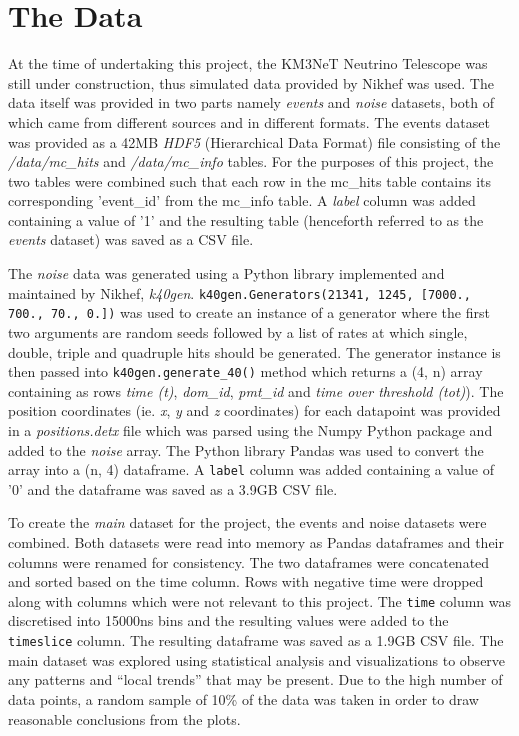 
\chapter{The Data} %
\label{cha:data}


At the time of undertaking this project, the KM3NeT Neutrino Telescope
was still under construction, thus simulated data provided by Nikhef
was used. The data itself was provided in two parts namely
\emph{events} and \emph{noise} datasets, both of which came from
different sources and in different formats. The events dataset was
provided as a 42MB \emph{HDF5} (Hierarchical Data Format) file
consisting of the \emph{/data/mc\_hits} and \emph{/data/mc\_info}
tables. For the purposes of this project, the two tables were combined
such that each row in the mc\_hits table contains its corresponding
'event\_id' from the mc\_info table. A \emph{label} column was added
containing a value of '1' and the resulting table (henceforth referred
to as the \emph{events} dataset) was saved as a CSV file.

The \emph{noise} data was generated using a Python library implemented
and maintained by Nikhef, \emph{k40gen}.
\texttt{k40gen.Generators(21341, 1245, [7000., 700., 70., 0.])} was
used to create an instance of a generator where the first two
arguments are random seeds followed by a list of rates at which
single, double, triple and quadruple hits should be generated. The
generator instance is then passed into \texttt{k40gen.generate\_40()}
method which returns a (4, n) array containing as rows \emph{time
(t)}, \emph{dom\_id}, \emph{pmt\_id} and \emph{time over threshold
(tot)}). The position coordinates (ie. \emph{x}, \emph{y} and \emph{z}
coordinates) for each datapoint was provided in a
\emph{positions.detx} file which was parsed using the Numpy Python
package \cite{numpy} and added to the \emph{noise} array. The Python
library Pandas \cite{pandas} was used to convert the array into a (n,
4) dataframe. A \texttt{label} column was added containing a value of
'0' and the dataframe was saved as a 3.9GB CSV file.

To create the \emph{main} dataset for the project, the events and
noise datasets were combined. Both datasets were read into memory as
Pandas dataframes and their columns were renamed for consistency. The
two dataframes were concatenated and sorted based on the time column.
Rows with negative time were dropped along with columns which were not
relevant to this project. The \texttt{time} column was discretised
into 15000ns bins and the resulting values were added to the
\texttt{timeslice} column. The resulting dataframe was saved as a
1.9GB CSV file. The main dataset was explored using statistical
analysis and visualizations to observe any patterns and ``local
trends'' that may be present. Due to the high number of data points, a
random sample of 10\% of the data was taken in order to draw
reasonable conclusions from the plots.

